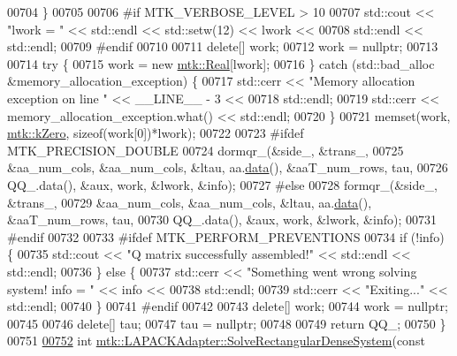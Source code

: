 \begin{DoxyCode}
00704   \}
00705 
00706 \textcolor{preprocessor}{  #if MTK\_VERBOSE\_LEVEL > 10}
00707   std::cout << \textcolor{stringliteral}{"lwork = "} << std::endl << std::setw(12) << lwork <<
00708     std::endl << std::endl;
00709 \textcolor{preprocessor}{  #endif}
00710 
00711   \textcolor{keyword}{delete}[] work;
00712   work = \textcolor{keyword}{nullptr};
00713 
00714   \textcolor{keywordflow}{try} \{
00715     work = \textcolor{keyword}{new} \hyperlink{group__c01-roots_gac080bbbf5cbb5502c9f00405f894857d}{mtk::Real}[lwork];
00716   \} \textcolor{keywordflow}{catch} (std::bad\_alloc &memory\_allocation\_exception) \{
00717     std::cerr << \textcolor{stringliteral}{"Memory allocation exception on line "} << \_\_LINE\_\_ - 3 <<
00718       std::endl;
00719     std::cerr << memory\_allocation\_exception.what() << std::endl;
00720   \}
00721   memset(work, \hyperlink{group__c01-roots_ga59a451a5fae30d59649bcda274fea271}{mtk::kZero}, \textcolor{keyword}{sizeof}(work[0])*lwork);
00722 
00723 \textcolor{preprocessor}{  #ifdef MTK\_PRECISION\_DOUBLE}
00724   dormqr\_(&side\_, &trans\_,
00725           &aa\_num\_cols, &aa\_num\_cols, &ltau, aa.\hyperlink{classmtk_1_1DenseMatrix_a0c33b8a9e01d157c61ddbdf807c25d84}{data}(), &aaT\_num\_rows, tau,
00726           QQ\_.data(), &aux, work, &lwork, &info);
00727 \textcolor{preprocessor}{  #else}
00728   formqr\_(&side\_, &trans\_,
00729           &aa\_num\_cols, &aa\_num\_cols, &ltau, aa.\hyperlink{classmtk_1_1DenseMatrix_a0c33b8a9e01d157c61ddbdf807c25d84}{data}(), &aaT\_num\_rows, tau,
00730           QQ\_.data(), &aux, work, &lwork, &info);
00731 \textcolor{preprocessor}{  #endif}
00732 
00733 \textcolor{preprocessor}{  #ifdef MTK\_PERFORM\_PREVENTIONS}
00734   \textcolor{keywordflow}{if} (!info) \{
00735     std::cout << \textcolor{stringliteral}{"Q matrix successfully assembled!"} << std::endl << std::endl;
00736   \} \textcolor{keywordflow}{else} \{
00737     std::cerr << \textcolor{stringliteral}{"Something went wrong solving system! info = "} << info <<
00738       std::endl;
00739     std::cerr << \textcolor{stringliteral}{"Exiting..."} << std::endl;
00740   \}
00741 \textcolor{preprocessor}{  #endif}
00742 
00743   \textcolor{keyword}{delete}[] work;
00744   work = \textcolor{keyword}{nullptr};
00745 
00746   \textcolor{keyword}{delete}[] tau;
00747   tau = \textcolor{keyword}{nullptr};
00748 
00749   \textcolor{keywordflow}{return} QQ\_;
00750 \}
00751 
\hypertarget{mtk__lapack__adapter_8cc_source_l00752}{}\hyperlink{classmtk_1_1LAPACKAdapter_a380f148ffdf96bae2f79ae28f1a6560c}{00752} \textcolor{keywordtype}{int} \hyperlink{classmtk_1_1LAPACKAdapter_a380f148ffdf96bae2f79ae28f1a6560c}{mtk::LAPACKAdapter::SolveRectangularDenseSystem}(\textcolor{keyword}{const} 

\end{DoxyCode}
